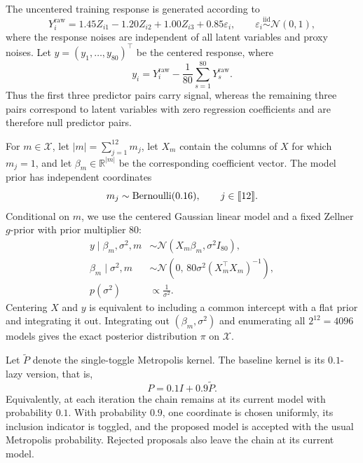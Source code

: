 \documentclass[11pt]{article}
\newcommand{\1}{\mathbf{1}}
\newcommand{\X}{\mathcal{X}}
\providecommand{\llbracket}{\mathopen{[\mkern-2.7mu[}}
\providecommand{\rrbracket}{\mathclose{]\mkern-2.7mu]}}
\begin{document}
The uncentered training response is generated according to
\[
Y_i^{\mathrm{raw}}
=
1.45Z_{i1}
-1.20Z_{i2}
+1.00Z_{i3}
+0.85\varepsilon_i,
\qquad
\varepsilon_i\stackrel{\mathrm{iid}}{\sim}\mathcal N(0,1),
\]
where the response noises are independent of all latent variables and
proxy noises.  Let $y=(y_1,\ldots,y_{80})^\top$ be the centered
response, where
\[
y_i
=
Y_i^{\mathrm{raw}}
-\frac{1}{80}\sum_{s=1}^{80}Y_s^{\mathrm{raw}}.
\]
Thus the first three predictor pairs carry signal, whereas the
remaining three pairs correspond to latent variables with zero
regression coefficients and are therefore null predictor pairs.

For $m\in\X$, let $|m|=\sum_{j=1}^{12}m_j$, let $X_m$ contain the
columns of $X$ for which $m_j=1$, and let
$\beta_m\in\mathbb R^{|m|}$ be the corresponding coefficient vector.
The model prior has independent coordinates
\[
m_j\sim\operatorname{Bernoulli}(0.16),
\qquad j\in\llbracket 12\rrbracket.
\]
Conditional on $m$, we use the centered Gaussian linear model and a
fixed Zellner $g$-prior with prior multiplier $80$:
\[
\begin{aligned}
	y\mid\beta_m,\sigma^2,m
	&\sim
	\mathcal N\!\left(
	X_m\beta_m,\sigma^2I_{80}
	\right),\\
	\beta_m\mid\sigma^2,m
	&\sim
	\mathcal N\!\left(
	0,\,
	80\sigma^2(X_m^\top X_m)^{-1}
	\right),\\
	p(\sigma^2)
	&\propto
	\frac{1}{\sigma^2}.
\end{aligned}
\]
Centering $X$ and $y$ is equivalent to including a common intercept
with a flat prior and integrating it out.  Integrating out
$(\beta_m,\sigma^2)$ and enumerating all $2^{12}=4096$ models gives
the exact posterior distribution $\pi$ on $\X$.

Let $\widetilde P$ denote the single-toggle Metropolis kernel.  The
baseline kernel is its $0.1$-lazy version, that is,
\[
P=0.1I+0.9\widetilde P.
\]
Equivalently, at each iteration the chain remains at its current model
with probability $0.1$.  With probability $0.9$, one coordinate is
chosen uniformly, its inclusion indicator is toggled, and the proposed
model is accepted with the usual Metropolis probability.  Rejected
proposals also leave the chain at its current model.
\end{document}
